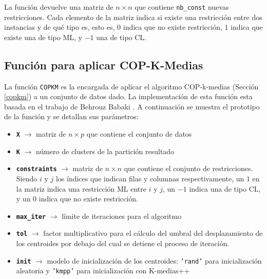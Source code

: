 La función devuelve una matriz de $n \times n$ que contiene \texttt{nb\_const} nuevas restricciones. Cada elemento de la matriz indica si existe una restricción entre dos instancias y de qué tipo es, esto es, $0$ indica que no existe restricción, $1$ indica que existe una de tipo \acs{ML}, y $-1$ una de tipo \acs{CL}.

\subsection{Función para aplicar COP-K-Medias}

La función \texttt{COPKM} es la encargada de aplicar el algoritmo COP-k-medias (Sección \ref{copkm}) a un conjunto de datos dado. La implementación de esta función esta basada en el trabajo de Behrouz Babaki \cite{Behrouz:2017}. A continuación se muestra el prototipo de la función y se detallan sus parámetros:


\begin{itemize}
	
	\item \textbf{\texttt{X}} {$\longrightarrow$ matriz de $n \times p$ que contiene el conjunto de datos}
	
	\item \textbf{\texttt{K}} {$\longrightarrow$ número de clusters de la partición resultado}
	
	\item \textbf{\texttt{constraints}} {$\longrightarrow$ matriz de $n \times n$ que contiene el conjunto de restricciones. Siendo $i$ y $j$ los índices que indican filas y columnas respectivamente, un $1$ en la matriz indica una restricción \acs{ML} entre $i$ y $j$, un $-1$ indica una de tipo \acs{CL}, y un $0$ indica que no existe restricción.}
	
	\item \textbf{\texttt{max\_iter}} {$\longrightarrow$ límite de iteraciones para el algoritmo}
	
	\item \textbf{\texttt{tol}} {$\longrightarrow$ factor multiplicativo para el cálculo del umbral del desplazamiento de los centroides por debajo del cual se detiene el proceso de iteración.}
	
	\item \textbf{\texttt{init}} {$\longrightarrow$ modelo de inicialización de los centroides: \texttt{'rand'} para inicialización aleatoria y \texttt{'kmpp'} para inicialización con K-medias++}
	
\end{itemize}

